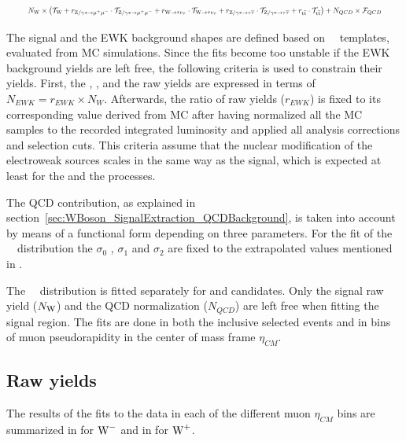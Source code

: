 \begin{equation}
\resizebox{0.935\textwidth}{!}{%
${ N_{\W} \times \left( {\mathcal{T}_{\W}} + {r_{\DYToMuMu} \cdot \mathcal{T}_{\DYToMuMu}} + {r_{\WToTauNu} \cdot \mathcal{T}_{\WToTauNu}} + {r_{\DYToTauTau} \cdot \mathcal{T}_{\DYToTauTau}} + {r_{\ttbar} \cdot \mathcal{T}_{\ttbar}} \right) } + { N_{QCD} \times \mathcal{F}_{QCD} }$%
}
\label{eq:FitModel}
\end{equation}

The signal and the EWK background shapes are defined based on \ETslash\ \ templates, evaluated from MC simulations. Since the fits become too unstable if the EWK background yields are left free, the following criteria is used to constrain their yields. First, the \DYToMuMu , \WToTauNu, \DYToTauTau and the \ttbar raw yields are expressed in terms of $N_{EWK} = r_{EWK}\times N_{W}$. Afterwards, the ratio of raw yields ($r_{EWK}$) is fixed to its corresponding value derived from MC after having normalized all the MC samples to the recorded integrated luminosity and applied all analysis corrections and selection cuts. This criteria assume that the nuclear modification of the electroweak sources scales in the same way as the \W signal, which is expected at least for the \WToTauNu and the \DY processes.

The QCD contribution, as explained in section~\ref{sec:WBoson_SignalExtraction_QCDBackground}, is taken into account by means of a functional form depending on three parameters. For the fit of the \ETslash\ \  distribution the $\sigma_{0}$ , $\sigma_{1}$ and $\sigma_{2}$ are fixed to the extrapolated values mentioned in .

The \ETslash\ \ distribution is fitted separately for \WToMuNuPl and \WToMuNuMi candidates. Only the signal raw yield ($N_{\text{W}}$) and the QCD normalization ($N_{QCD}$) are left free when fitting the \W signal region. The fits are done in both the inclusive selected events and in bins of muon pseudorapidity in the center of mass frame $\eta_{CM}$.


\subsection{Raw yields}\label{sec:WBoson_SignalExtraction_RawYields}


The results of the fits to the data in each of the different muon $\eta_{CM}$ bins are summarized in  for $\text{W}^{-}$ and in  for $\text{W}^{+}$.

